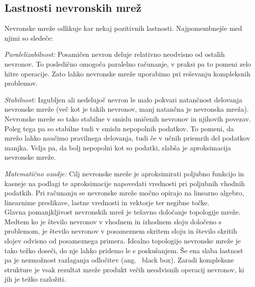 \documentclass[mat1]{fmfdelo}
\begin{document}
\subsection{Lastnosti nevronskih mrež}
Nevronske mreže odlikuje kar nekaj pozitivnih lastnosti. Najpomembnejše med njimi so sledeče:

\emph{Paralelizabilnost: }Posamičen nevron deluje relativno neodvisno od ostalih nevronov. To posledično omogoča paralelno računanje, v praksi pa to pomeni zelo hitre operacije. Zato lahko nevronske mreže uporabimo pri reševanju kompleksnih problemov.

\emph{Stabilnost: }Izgubljen ali nedelujoč nevron le malo pokvari natančnost delovanja nevronske mreže (več kot je takih nevronov, manj natančna je nevronska mreža). Nevronske mreže so tako stabilne v smislu uničenih nevronov in njihovih povezav. Poleg tega pa so stabilne tudi v smislu nepopolnih podatkov. To pomeni, da mrežo lahko naučimo pravilnega delovanja, tudi če v učnih priemrih del podatkov manjka. Velja pa, da bolj nepopolni kot so podatki, slabša je aproksimacija nevronske mreže.

\emph{Matematično ozadje: }Cilj nevronske mreže je aproksimirati poljubno funkcijo in kasneje na podlagi te aproksimacije napovedati vrednosti pri poljubnih vhodnih podatkih. Pri računanju se nevronske mreže močno opirajo na linearno algebro, linearnime preslikave, lastne vrednosti in vektorje ter negibne točke.\\

Glavna pomanjkljivost nevronskih mrež je težavno določanje topologije mreže. Medtem ko je število nevronov v vhodnem in izhodnem sloju določeno s problemom, je število nevronov v posameznem skritem sloju in število skritih slojev odvisno od posameznega primera. Idealno topologijo nevronske mreže je tako težko doseči, do nje lahko pridemo le s poskušanjem. Še ena slaba lastnost pa je nezmožnost razlaganja odločitev (ang.~ black box). Zaradi kompleksne strukture je vsak rezultat mreže produkt večih neodvisnih operacij nevronov, ki jih je težko razložiti.
%
%
\end{document}
